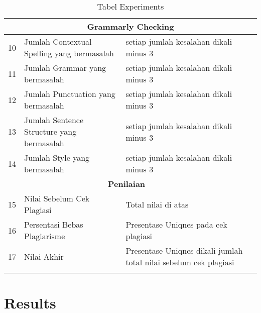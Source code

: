 \begin{longtable}{|p{}|p{}|p{}|p{}|}
\multicolumn{4}{c}{\textbf{Grammarly Checking}}\\ \hline

10 &Jumlah Contextual Spelling yang bermasalah&setiap jumlah kesalahan dikali minus 3& \\ \hline

11 &Jumlah Grammar yang bermasalah&setiap jumlah kesalahan dikali minus 3& \\ \hline

12 &Jumlah Punctuation yang bermasalah&setiap jumlah kesalahan dikali minus 3& \\ \hline

13 &Jumlah Sentence Structure yang bermasalah&setiap jumlah kesalahan dikali minus 3& \\ \hline

14 &Jumlah Style yang bermasalah&setiap jumlah kesalahan dikali minus 3& \\ \hline

\multicolumn{3}{c}{\textbf{Penilaian}}\\ \hline

15 &Nilai Sebelum Cek Plagiasi&Total nilai di atas& \\ \hline

16 &Persentasi Bebas Plagiarisme&Presentase Uniqnes pada cek plagiasi& \\ \hline

17 &Nilai Akhir&Presentase Uniqnes dikali jumlah total nilai sebelum cek plagiasi& \\ \hline

\caption{Tabel Experiments}
\label{table:experiments}
\end{longtable}



\section{Results}

